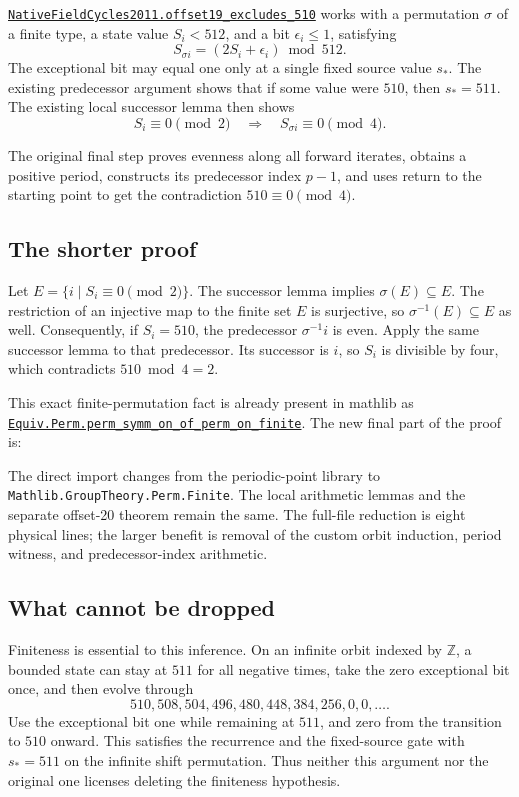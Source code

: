 \documentclass[11pt,letterpaper]{article}
\newcommand{\code}[1]{\nolinkurl{#1}}
\newcommand{\repo}[2]{\href{https://github.com/VladimirReshetnikov/ProveIt/blob/b310142330df89e48413c8fce62e7de223e1c7d5/#1}{#2}}
\newcommand{\modulelink}[2]{\repo{Computability/DiophantineConsistency/Lean/DiophantineConsistency/#1.lean}{#2}}
\begin{document}
\modulelink{NativeFieldCycles2011}{\code{NativeFieldCycles2011.offset19_excludes_510}}
works with a permutation $\sigma$ of a finite type, a state value $S_i<512$,
and a bit $\epsilon_i\le1$, satisfying
\[
 S_{\sigma i}=(2S_i+\epsilon_i)\bmod512.
\]
The exceptional bit may equal one only at a single fixed source value
$s_\ast$. The existing predecessor argument shows that if some value were
$510$, then $s_\ast=511$. The existing local successor lemma then shows
\[
 S_i\equiv0\pmod2\quad\Longrightarrow\quad
 S_{\sigma i}\equiv0\pmod4.
\]

The original final step proves evenness along all forward iterates, obtains
a positive period, constructs its predecessor index $p-1$, and uses return
to the starting point to get the contradiction $510\equiv0\pmod4$.

\subsection{The shorter proof}

Let $E=\{i\mid S_i\equiv0\pmod2\}$. The successor lemma implies
$\sigma(E)\subseteq E$. The restriction of an injective map to the finite set
$E$ is surjective, so $\sigma^{-1}(E)\subseteq E$ as well. Consequently,
if $S_i=510$, the predecessor $\sigma^{-1}i$ is even. Apply the same successor
lemma to that predecessor. Its successor is $i$, so $S_i$ is divisible by
four, which contradicts $510\bmod4=2$.

This exact finite-permutation fact is already present in mathlib as
\href{https://github.com/leanprover-community/mathlib4/blob/81a5d257c8e410db227a6665ed08f64fea08e997/Mathlib/GroupTheory/Perm/Finite.lean}{\code{Equiv.Perm.perm_symm_on_of_perm_on_finite}}.
The new final part of the proof is:


The direct import changes from the periodic-point library to
\code{Mathlib.GroupTheory.Perm.Finite}. The local arithmetic lemmas and the
separate offset-20 theorem remain the same. The full-file reduction is eight
physical lines; the larger benefit is removal of the custom orbit induction,
period witness, and predecessor-index arithmetic.

\subsection{What cannot be dropped}

Finiteness is essential to this inference. On an infinite orbit indexed by
$\mathbb Z$, a bounded state can stay at $511$ for all negative times, take
the zero exceptional bit once, and then evolve through
\[
 510,508,504,496,480,448,384,256,0,0,\ldots.
\]
Use the exceptional bit one while remaining at $511$, and zero from the
transition to $510$ onward. This satisfies the recurrence and the fixed-source
gate with $s_\ast=511$ on the infinite shift permutation. Thus neither this
argument nor the original one licenses deleting the finiteness hypothesis.
\end{document}
